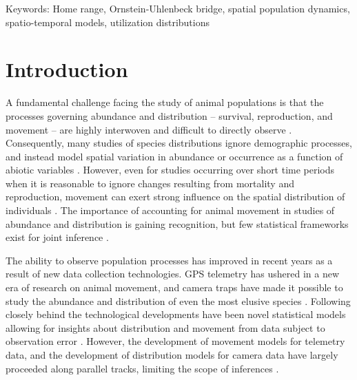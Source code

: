\documentclass[12pt]{article}
\begin{document}
  
\noindent
Keywords: Home range, Ornstein-Uhlenbeck bridge, spatial population
dynamics, spatio-temporal models, utilization distributions



\clearpage

\section{Introduction}

A fundamental challenge facing the study of animal populations is
that the processes governing abundance and distribution -- %
survival, reproduction, and movement -- are highly interwoven and
difficult to directly observe
\citep{williams_etal:2002,royle_dorazio:2008}. Consequently, many
studies of species distributions ignore demographic processes, and
instead model spatial variation in abundance or occurrence as a
function of abiotic variables \citep{elith_etal:2006}. However, even
for studies occurring over short time periods when it is reasonable
to ignore changes resulting from mortality and reproduction, movement
can exert strong influence on the spatial distribution of individuals
\citep{jouventin_weimerskirch:1990,andrew_fox:2020}.
The importance of accounting for animal movement in studies of
abundance and distribution is gaining recognition, but few statistical
frameworks exist for joint inference
\citep{morales_etal:2010,matthiopoulos_etal:2015,spiegel_etal:2017}. 

The ability to observe population processes has improved in
recent years as a result of new data collection technologies. 
GPS telemetry has ushered in a new era of research
on animal movement, and camera traps have made it possible to 
study the abundance and distribution of even the most elusive species
\citep{cagnacci_etal:2010,oconnell_etal:2010}. Following closely
behind the technological developments have been novel statistical
models allowing for insights about distribution and movement from data
subject to observation error
\citep{royle_etal:2014,hooten_etal:2017}. 
However, the development of movement models for telemetry data, and
the development of distribution models for camera data
have largely proceeded along parallel tracks, limiting the scope of
inferences \citep{mcclintock_etal:2021}. 
\end{document}
